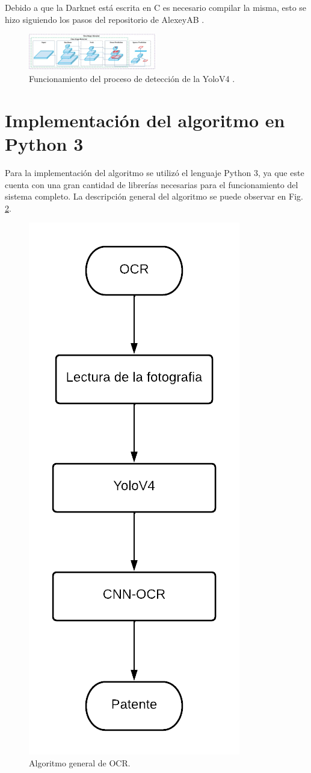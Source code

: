 Debido a que la Darknet está escrita en C es necesario compilar la misma, esto se hizo siguiendo los pasos del repositorio de AlexeyAB \cite{alexey_yolo_2023}.


\begin{figure}
    \centering
    \includegraphics[width=0.5\textwidth]{imgs/funcionamiento-yolo.png}
    \caption{Funcionamiento del proceso de detección de la YoloV4 \cite{bochkovskiy_yolov4_2020}.}
    \label{fig:funcionamiento-yolo}
\end{figure}



\section{Implementación del algoritmo en Python 3}

Para la implementación del algoritmo se utilizó el lenguaje Python 3, ya que este cuenta con una gran cantidad de librerías necesarias para el funcionamiento del sistema completo. La descripción general del algoritmo se puede observar en Fig. \ref{fig:algoritmo-ocr}.

\begin{figure}
    \centering
    \includegraphics[width=.25\textwidth]{imgs/flujo-algoritmo-ocr.png}
    \caption{Algoritmo general de OCR.}
    \label{fig:algoritmo-ocr}
\end{figure}

